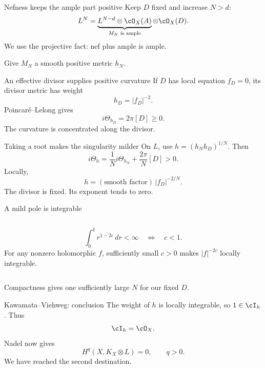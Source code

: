 \begin{frame}{Nefness keeps the ample part positive}
Keep \(D\) fixed and increase \(N>d\):
\[
L^N=
\underbrace{L^{N-d}\otimes\cO_X(A)}_{M_N\text{ is ample}}
\otimes\cO_X(D).
\]
We use the projective fact: nef plus ample is ample.
\bigskip
\par Give \(M_N\) a smooth positive metric \(h_N\).
\end{frame}

\begin{frame}{An effective divisor supplies positive curvature}
If \(D\) has local equation \(f_D=0\), its divisor metric has weight
\[
h_D=|f_D|^{-2}.
\]
Poincaré--Lelong gives
\[
\boxed{i\Theta_{h_D}=2\pi[D]\ge0.}
\]
The curvature is concentrated along the divisor.
\end{frame}

\begin{frame}{Taking a root makes the singularity milder}
On \(L\), use \(h=(h_Nh_D)^{1/N}\).
Then
\[
i\Theta_h=\frac1N i\Theta_{h_N}+\frac{2\pi}{N}[D]>0.
\]
Locally,
\[
h=(\text{smooth factor})\,|f_D|^{-2/N}.
\]
The divisor is fixed. Its exponent tends to zero.
\end{frame}

\begin{frame}{A mild pole is integrable}
\begin{columns}[c]
\centering
{}
\[
\int_0^\delta r^{1-2c}\,dr<\infty
\quad\Longleftrightarrow\quad c<1.
\]
For any nonzero holomorphic \(f\), sufficiently small \(c>0\) makes \(|f|^{-2c}\) locally integrable.
\end{columns}
\medskip
Compactness gives one sufficiently large \(N\) for our fixed \(D\).
\end{frame}

\begin{frame}{Kawamata--Viehweg: conclusion}
The weight of \(h\) is locally integrable, so \(1\in\cI_h\).
Thus
\[
\cI_h=\cO_X.
\]
Nadel now gives
\[
\boxed{H^q(X,K_X\otimes L)=0,\qquad q>0.}
\]
We have reached the second destination.
\end{frame}

